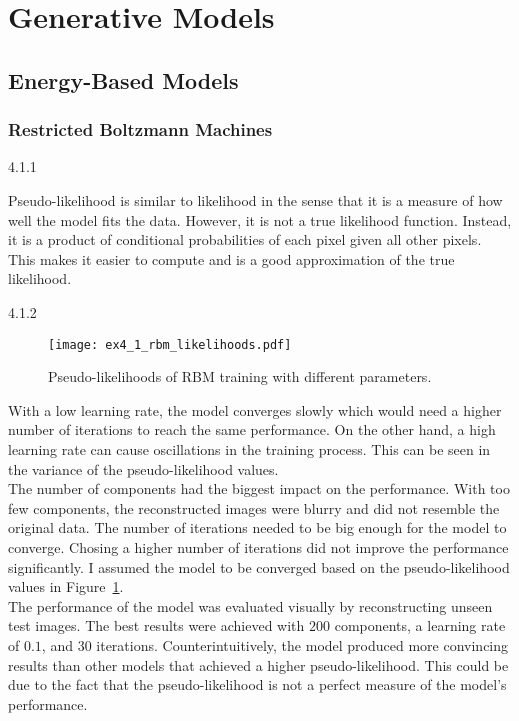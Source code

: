 
\section{Generative Models}
\label{ex:4}


\subsection{Energy-Based Models}
\label{ex:4.1}

\subsubsection*{Restricted Boltzmann Machines}

\begin{task}{4.1.1}
\end{task}

Pseudo-likelihood is similar to likelihood in the sense that it is a measure of how well the model
fits the data. However, it is not a true likelihood function. Instead, it is a product of
conditional probabilities of each pixel given all other pixels. This makes it easier to compute and
is a good approximation of the true likelihood.


\begin{task}{4.1.2}
\end{task}

\begin{figure}[ht]
  \centering
  \texttt{[image: ex4\_1\_rbm\_likelihoods.pdf]}
  \caption{Pseudo-likelihoods of RBM training with different parameters.}
  \label{fig:ex4_1_rbm_likelihoods}
\end{figure}

With a low learning rate, the model converges slowly which would need a higher number of iterations
to reach the same performance. On the other hand, a high learning rate can cause oscillations in the
training process. This can be seen in the variance of the pseudo-likelihood values.\\
The number of components had the biggest impact on the performance. With too few components, the
reconstructed images were blurry and did not resemble the original data. The number of iterations
needed to be big enough for the model to converge. Chosing a higher number of iterations did not
improve the performance significantly. I assumed the model to be converged based on the
pseudo-likelihood values in Figure~\ref{fig:ex4_1_rbm_likelihoods}.\\
The performance of the model was evaluated visually by reconstructing unseen test images. The best
results were achieved with $200$ components, a learning rate of $0.1$, and $30$ iterations.
Counterintuitively, the model produced more convincing results than other models that achieved a
higher pseudo-likelihood. This could be due to the fact that the pseudo-likelihood is not a perfect
measure of the model's performance.


